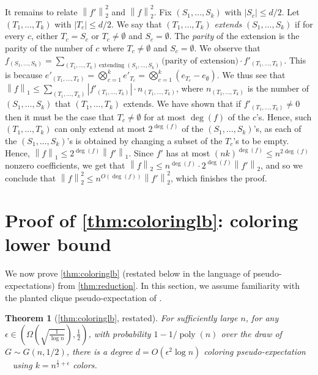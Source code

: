 \documentclass[10pt,a4paper]{article}
\newtheorem*{theorem*}{Theorem}
\theoremstyle{definition}
\DeclareMathOperator{\poly}{poly}
\newcommand{\eps}{\epsilon}
\DeclareMathOperator{\pE}{\tilde{\mathbb{E}}}
\def\abs#1{\left|#1  \right|}
\def\norm#1{\left\| #1 \right\|}
\newcommand{\numcolors}{k}
\begin{document}
It remains to relate $\norm{f'}_2^2$ and $\norm{f}_2^2$. Fix $(S_1, \dots, S_\numcolors)$ with $\abs{S_c} \leq d/2$. Let $(T_1, \dots, T_\numcolors)$ with $\abs{T_c} \leq d/2$. We say that $(T_1, \dots, T_\numcolors)$ \emph{extends} $(S_1, \dots, S_\numcolors)$ if for every $c$, either $T_c = S_c$ or $T_c \ne \emptyset$ and $S_c = \emptyset$. The \emph{parity} of the extension is the parity of the number of $c$ where $T_c \ne \emptyset$ and $S_c = \emptyset$. We observe that $f_{(S_1, \dots, S_\numcolors)} = \sum_{(T_1, \dots, T_\numcolors) \ \text{extending } (S_1, \dots, S_\numcolors)} \text{(parity of extension)} \cdot f'_{(T_1, \dots, T_\numcolors)}$. This is because $e'_{(T_1, \dots, T_\numcolors)} = \bigotimes_{c = 1}^\numcolors e'_{T_c} = \bigotimes_{c = 1}^\numcolors (e_{T_c} - e_{\emptyset})$. We thus see that $\norm{f}_1 \leq \sum_{(T_1, \dots, T_\numcolors)} \abs{f'_{(T_1, \dots, T_\numcolors)}} \cdot n_{(T_1, \dots, T_\numcolors)}$, where $n_{(T_1, \dots, T_\numcolors)}$ is the number of $(S_1, \dots, S_\numcolors)$ that $(T_1, \dots, T_\numcolors)$ extends. We have shown that if $f'_{(T_1, \dots, T_\numcolors)} \ne 0$ then it must be the case that $T_{c} \ne \emptyset$ for at most $\deg(f)$ of the $c$'s. Hence, such $(T_1, \dots, T_\numcolors)$ can only extend at most $2^{\deg(f)}$ of the $(S_1, \dots, S_\numcolors)$'s, as each of the $(S_1, \dots, S_\numcolors)$'s is obtained by changing a subset of the $T_c$'s to be empty. Hence, $\norm{f}_1 \leq 2^{\deg(f)} \norm{f'}_1$. Since $f'$ has at most $(n\numcolors)^{\deg(f)} \leq n^{2 \deg(f)}$ nonzero coefficients, we get that $\norm{f}_2 \leq n^{ \deg(f)} \cdot 2^{\deg(f)} \norm{f'}_2$, and so we conclude that $\norm{f}_2^2 \leq n^{O(\deg(f))} \norm{f'}_2^2$, which finishes the proof.








\section{Proof of \cref{thm:coloringlb}: coloring lower bound}
\label{sec:fmain}
We now prove \cref{thm:coloringlb} (restated below in the language of pseudo-expectations) from \cref{thm:reduction}. In this section, we assume familiarity with the planted clique pseudo-expectation of \cite{DBLP:conf/focs/BarakHKKMP16}. 
\begin{theorem*}[\cref{thm:coloringlb}, restated]
For sufficiently large $n$, for any $\eps \in (\Omega(\sqrt{\frac{1}{\log n}}), \frac{1}{2})$, with probability $1 - 1/\poly(n)$ over the draw of $G \sim G(n,1/2)$, there is a degree $d = O(\eps^2 \log n)$ coloring pseudo-expectation $\pE$ using $k = n^{\frac{1}{2} + \eps}$ colors.
\end{theorem*}
\end{document}
